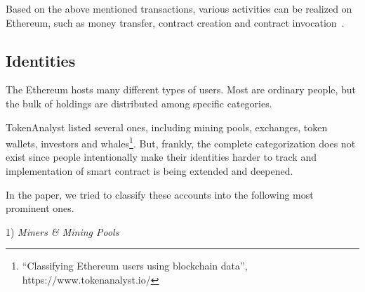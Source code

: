  

Based on the above mentioned transactions, various activities can be realized on Ethereum, such as money transfer, contract creation and contract invocation~\cite{chen2018infocom}. 



 
\subsection{Identities}
The Ethereum hosts many different types of users. Most are ordinary people, but the bulk of holdings are distributed among specific categories. 

TokenAnalyst listed several ones, including  mining pools, exchanges, token wallets, investors and whales\footnote{``Classifying Ethereum users using blockchain data'', https://www.tokenanalyst.io/}. But, frankly, the complete categorization does not exist since people intentionally make their identities harder to track and implementation of smart contract is being extended and deepened.

In the paper, we tried to classify these accounts into the following most prominent ones.


1) \emph{Miners \& Mining Pools}

